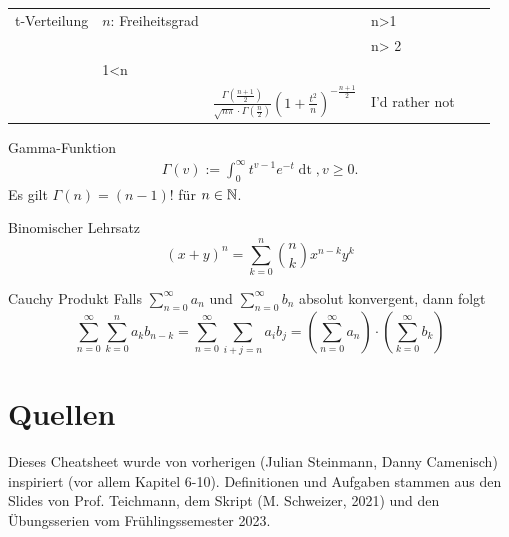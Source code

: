 \begin{center}
\begin{table}
\begin{tabularx}{\textwidth}{llXXXX}
				t-Verteilung             & \( n \): Freiheitsgrad               & \( \begin{cases} 0 & n>1 \\ \text{undef.} & \text{sonst} \end{cases} \) & \( \begin{cases} \frac{n}{n-2} & n> 2 \\ \infty & 1<n \leq 2 \\ \text{undef.} & \text{sonst} \end{cases} \) & \( \frac{\Gamma \left( \frac{n+1}{2} \right) }{\sqrt{n\pi } \cdot \Gamma (\frac{n}{2})} \left( 1+ \frac{t^2}{n} \right) ^{- \frac{n+1}{2}} \) & I'd rather not                                \\
		
		
	
			\bottomrule
		\end{tabularx}

    \end{table}
\end{center}

\vspace*{-1.1cm}
\begin{subbox}{Gamma-Funktion}
	\begin{align*}
		\Gamma(v) := \int_0^\infty t^{v-1}e^{-t}\mathop{dt}, v \geq 0.
	\end{align*}
	Es gilt $\Gamma(n) = (n-1)!$ für $n \in \mathbb{N}$.
\end{subbox}
\begin{subbox}{Binomischer Lehrsatz}
	\[(x + y)^n = \sum_{k = 0}^n  \binom{n}{k} x^{n-k}y^k\]
\end{subbox}
\break
\vspace*{12.5cm}
\begin{subbox}{Cauchy Produkt}
	Falls $\sum_{n= 0}^\infty a_n$ und $\sum_{n = 0}^\infty b_n$ absolut konvergent, dann folgt
	\[\sum_{n = 0}^\infty \sum_{k = 0}^n a_kb_{n-k} = \sum_{n = 0}^\infty \sum_{i+j = n} a_ib_j = \left(\sum_{n = 0}^\infty a_n\right) \cdot \left(\sum_{k = 0}^\infty b_k\right)\]
\end{subbox}
\section{Quellen}
Dieses Cheatsheet wurde von vorherigen (Julian Steinmann, Danny Camenisch) inspiriert (vor allem Kapitel 6-10). Definitionen und Aufgaben stammen aus den Slides von Prof. Teichmann, dem Skript (M. Schweizer, 2021) und den Übungsserien vom Frühlingssemester 2023.


